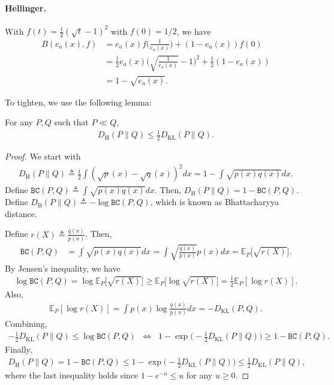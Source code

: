 \paragraph{Hellinger.} With $f(t) = \tfrac{1}{2}(\sqrt{t}-1)^2 $ with $f(0) = 1/2$, we have 
\begin{align}
    B(e_a(x), f) &= e_a(x)f\big(\tfrac{1}{e_a(x)}\big) + (1-e_a(x))f(0)  \\ 
                &= \frac{1}{2}e_a(x) \Big(\sqrt{\tfrac{1}{e_a(x)}} - 1\Big)^2 + \frac{1}{2}(1-e_a(x)) \\ 
                &= 1 - \sqrt{e_a(x)}.
\end{align}

To tighten, we use the following lemma: 
\begin{lemma}\label{lemma:hellinger-KL}
    \normalfont
    For any $P,Q$ such that $P \ll Q$, 
    \begin{align}
        D_{\mathrm{H}}(P \| Q) \leq \frac{1}{2}D_{\mathrm{KL}}(P \| Q). 
    \end{align}
\end{lemma}
\begin{proof}
    We start with 
    \begin{align}
        D_{\mathrm{H}}(P \| Q)  \triangleq \frac{1}{2}\int (\sqrt{p}(x) - \sqrt{q}(x))^2dx = 1-\int \sqrt{p(x)q(x)}dx.
    \end{align}
    Define $\mathtt{BC}(P,Q) \triangleq \int \sqrt{p(x)q(x)}dx$. Then, $D_{\mathrm{H}}(P \| Q)  = 1-\mathtt{BC}(P,Q)$. Define $D_{\mathrm{B}}(P \| Q) \triangleq -\log \mathtt{BC}(P,Q)$, which is known as Bhattacharyya distance. 

    Define $r(X) \triangleq \frac{q(x)}{p(x)}$. Then,
    \begin{align}
        \mathtt{BC}(P,Q) &= \int \sqrt{p(x) q(x)} dx =  \int \sqrt{\tfrac{q(x)}{p(x)}} p(x)dx = \mathbb{E}_{P}\Big[\sqrt{r(X)}\Big]. 
    \end{align}
    By Jensen's inequality, we have 
    \begin{align}
        \log \mathtt{BC}(P,Q)  = \log \mathbb{E}_{P}\Big[\sqrt{r(X)}\Big]  \geq  \mathbb{E}_{P}\Big[\log \sqrt{r(X)}\Big] = \frac{1}{2}\mathbb{E}_{P}[\log r(X)].
    \end{align}
    Also, 
    \begin{align}
        \mathbb{E}_{P}[\log r(X)] = \int p(x) \log \frac{q(x)}{p(x)}dx = -D_{\mathrm{KL}}(P,Q).
    \end{align}
    Combining, 
    \begin{align}
        -\frac{1}{2}D_{\mathrm{KL}}(P \| Q) \leq \log \mathtt{BC}(P,Q) \;\;\Leftrightarrow\;\; 1-\exp\Big(-\frac{1}{2}D_{\mathrm{KL}}(P \| Q)\Big) \geq 1-\mathtt{BC}(P,Q).
    \end{align}
    Finally, 
    \begin{align}
        D_{\mathrm{H}}(P \| Q)  = 1-\mathtt{BC}(P,Q) \leq 1-\exp\Big(-\frac{1}{2}D_{\mathrm{KL}}(P \| Q)\Big) \leq \frac{1}{2}D_{\mathrm{KL}}(P \| Q),
    \end{align}
    where the last inequality holds since $1-e^{-u} \leq u$ for any $u \geq 0$.
\end{proof}
